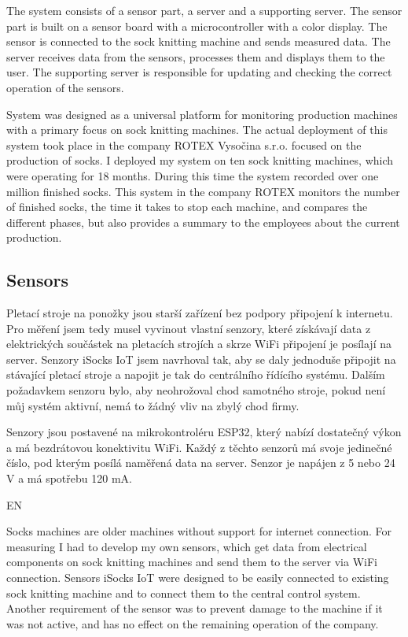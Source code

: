 \documentclass[12pt, a4paper]{article}
\begin{document}
The system consists of a sensor part, a server and a supporting server.
The sensor part is built on a sensor board with a microcontroller with a color display.
The sensor is connected to the sock knitting machine and sends measured data.
The server receives data from the sensors, processes them and displays them to the user.
The supporting server is responsible for updating and checking the correct operation of the sensors.

System was designed as a universal platform for monitoring production machines with a primary focus on sock knitting machines.
The actual deployment of this system took place in the company ROTEX Vysočina s.r.o. focused on the production of socks.
I deployed my system on ten sock knitting machines, which were operating for 18 months.
During this time the system recorded over one million finished socks.
This system in the company ROTEX monitors the number of finished socks, the time it takes to stop each machine, and compares the different phases, but also provides a summary to the employees about the current production.


\subsection*{Sensors}

Pletací stroje na ponožky jsou starší zařízení bez podpory připojení k internetu.
Pro měření jsem tedy musel vyvinout vlastní  senzory, které získávají data z elektrických součástek na pletacích  strojích a skrze WiFi připojení je posílají  na server.
Senzory iSocks IoT jsem navrhoval tak, aby se daly jednoduše připojit na stávající pletací stroje a napojit je tak do centrálního řídícího systému.
Dalším požadavkem senzoru bylo, aby neohrožoval chod samotného stroje, pokud není můj systém aktivní, nemá to žádný vliv na zbylý chod firmy.

Senzory jsou postavené na mikrokontroléru ESP32, který nabízí dostatečný výkon a má bezdrátovou konektivitu WiFi.
Každý z těchto senzorů má svoje jedinečné číslo, pod kterým posílá naměřená data na server.
Senzor je napájen z 5 nebo 24 V a má spotřebu 120 mA.

EN

Socks machines are older machines without support for internet connection.
For measuring I had to develop my own sensors, which get data from electrical components on sock knitting machines and send them to the server via WiFi connection.
Sensors iSocks IoT were designed to be easily connected to existing sock knitting machine and to connect them to the central control system.
Another requirement of the sensor was to prevent damage to the machine if it was not active, and has no effect on the remaining operation of the company.
\end{document}
